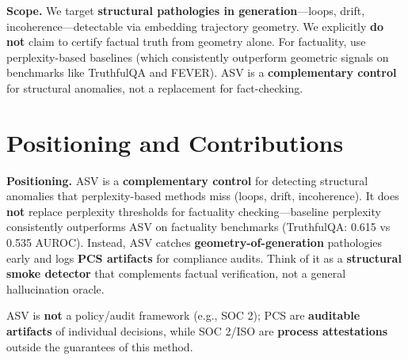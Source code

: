 \documentclass[11pt]{article}
\begin{document}
\textbf{Scope.} We target \textbf{structural pathologies in generation}---loops, drift, incoherence---detectable via embedding trajectory geometry. We explicitly \textbf{do not} claim to certify factual truth from geometry alone. For factuality, use perplexity-based baselines (which consistently outperform geometric signals on benchmarks like TruthfulQA and FEVER). ASV is a \textbf{complementary control} for structural anomalies, not a replacement for fact-checking.

\section{Positioning and Contributions}
\label{sec:contributions}

\textbf{Positioning.} ASV is a \textbf{complementary control} for detecting structural anomalies that perplexity-based methods miss (loops, drift, incoherence). It does \textbf{not} replace perplexity thresholds for factuality checking---baseline perplexity consistently outperforms ASV on factuality benchmarks (TruthfulQA: 0.615 vs 0.535 AUROC). Instead, ASV catches \textbf{geometry-of-generation} pathologies early and logs \textbf{PCS artifacts} for compliance audits. Think of it as a \textbf{structural smoke detector} that complements factual verification, not a general hallucination oracle.

ASV is \textbf{not} a policy/audit framework (e.g., SOC 2); PCS are \textbf{auditable artifacts} of individual decisions, while SOC 2/ISO are \textbf{process attestations} outside the guarantees of this method.
\end{document}
